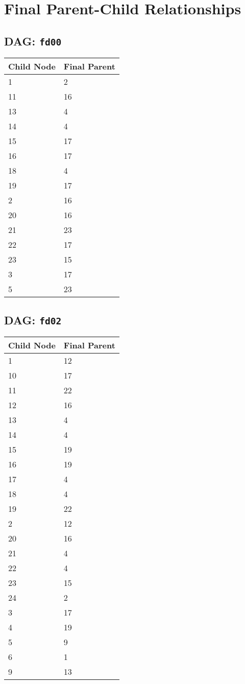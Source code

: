 \documentclass{article}
\begin{document}
\pagestyle{fancy}
\fancyhf{}
\section*{Final Parent-Child Relationships}
\subsection*{DAG: \texttt{fd00}}
\begin{tabular}{ll}
\toprule
\textbf{Child Node} & \textbf{Final Parent} \\
\midrule
1 & 2 \\
11 & 16 \\
13 & 4 \\
14 & 4 \\
15 & 17 \\
16 & 17 \\
18 & 4 \\
19 & 17 \\
2 & 16 \\
20 & 16 \\
21 & 23 \\
22 & 17 \\
23 & 15 \\
3 & 17 \\
5 & 23 \\
\bottomrule
\end{tabular}

\subsection*{DAG: \texttt{fd02}}
\begin{tabular}{ll}
\toprule
\textbf{Child Node} & \textbf{Final Parent} \\
\midrule
1 & 12 \\
10 & 17 \\
11 & 22 \\
12 & 16 \\
13 & 4 \\
14 & 4 \\
15 & 19 \\
16 & 19 \\
17 & 4 \\
18 & 4 \\
19 & 22 \\
2 & 12 \\
20 & 16 \\
21 & 4 \\
22 & 4 \\
23 & 15 \\
24 & 2 \\
3 & 17 \\
4 & 19 \\
5 & 9 \\
6 & 1 \\
9 & 13 \\
\bottomrule
\end{tabular}
\end{document}
